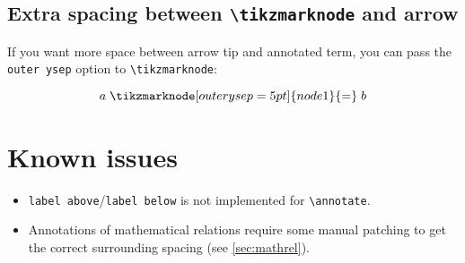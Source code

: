 \documentclass{article}
\begin{document}
\subsection{Extra spacing between \texttt{\textbackslash{}tikzmarknode} and arrow}
\label{sec:outerysep}

If you want more space between arrow tip and annotated term, you can pass the \texttt{outer ysep} option to \texttt{\textbackslash{}tikzmarknode}:
\begin{LTXexample}[text outside listing,lefthand width=0.5in]
\[
a \mathrel{\tikzmarknode[outer ysep=5pt]{node1}{=}} b
\]
\end{LTXexample}



\section{Known issues}

\begin{itemize}
    \item \texttt{label above}/\texttt{label below} is not implemented for \verb|\annotate|.

    \item Annotations of mathematical relations require some manual patching to get the correct surrounding spacing (see \cref{sec:mathrel}).

\end{itemize}
\end{document}
